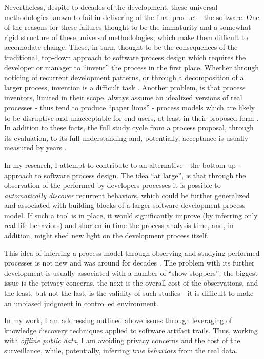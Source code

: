 \documentclass[11pt,oneside]{article}
\numberwithin{equation}{subsection}
\begin{document}
Nevertheless, despite to decades of the development, these universal methodologies known to fail in
delivering of the final product - the software. One of the reasons for these failures thought to be
the immaturity and a somewhat rigid structure of these universal methodologies, which make them
difficult to accomodate change. These, in turn, thought to be the consequences of the traditional,
top-down approach to software process design which requires the developer or manager to ``invent''
the process in the first place. Whether through noticing of recurrent development patterns, or
through a decomposition of a larger process, invention is a difficult task
\cite{citeulike:5043104}. 
Another problem, is that process inventors, limited in their scope, 
always assume an idealized versions of real processes - thus tend to produce ``paper lions'' - 
process models which are likely to be disruptive and  unacceptable for end users, at least 
in their proposed form \cite{citeulike:9758924}. In addition to these facts, the full study 
cycle from a process proposal, through its evaluation, to its full understanding and,
potentially, acceptance is usually measured by years \cite{citeulike:113403}.

In my research, I attempt to contribute to an alternative - the bottom-up - approach to software
process design. The idea ``at large'', is that through the observation of the performed 
by developers processes it is possible to \textit{automatically discover} recurrent behaviors, which
could be further generalized and associated with building blocks of a larger software development
process model. If such a tool is in place, it would significantly improve (by inferring only
real-life behaviors) and shorten in time the process analysis time, and, in addition,
might shed new light on the development process itself.

This idea of inferring a process model through observing and studying performed processes is
not new and was around for decades \cite{citeulike:328044}. The problem with its further
development is usually associated with a number of ``show-stoppers'': the biggest issue is the
privacy concerns, the next is the overall cost of the observations, and the least, but not
the last, is the validity of such studies - it is difficult to make an unbiased judgment in
controlled environment. 

In my work, I am addressing outlined above issues through leveraging of knowledge
discovery techniques applied to software artifact trails. Thus, working with \textit{offline
public data}, I am avoiding privacy concerns and the cost of the surveillance, while, potentially, 
inferring \textit{true behaviors} from the real data.
\end{document}
